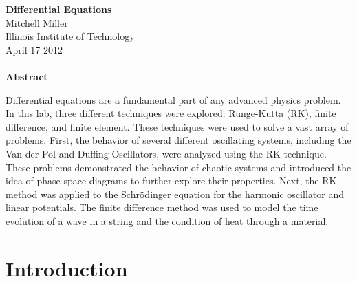 \documentclass[12pt]{article}
\begin{document}
\begin{center}
\textbf{Differential Equations} \\ 
Mitchell Miller \\
Illinois Institute of Technology \\
April  17 2012 {\ \\ \ \\}
\textbf{Abstract}\\
\end{center}
\noindent
Differential equations are a fundamental part of any advanced physics problem.  In this lab, three different techniques were explored:  Runge-Kutta (RK), finite difference, and finite element.  These techniques were used to solve a vast array of problems.  First, the behavior of several different oscillating systems, including the Van der Pol and Duffing Oscillators, were analyzed using the RK technique.  These problems demonstrated the behavior of chaotic systems and introduced the idea of phase space diagrams to further explore their properties.  Next, the RK method was applied to the Schr\"{o}dinger equation for the harmonic oscillator and linear potentials.  The finite difference method was used to model the time evolution of a wave in a string and the condition of heat through a material.
\pagebreak

\section{Introduction}
\end{document}
